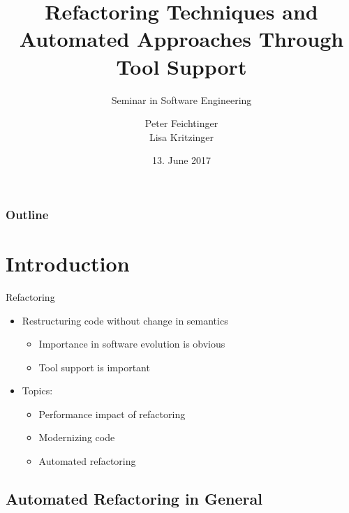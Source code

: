 \documentclass{beamer}
\title[Refactoring]{Refactoring Techniques and Automated Approaches Through Tool Support}
\subtitle{Seminar in Software Engineering}
\institute[]{Institute for Software Systems Engineering\\Johannes Kepler University Linz}
\author[Feichtinger, Kritzinger]{Peter Feichtinger\texorpdfstring{\\}{, }Lisa Kritzinger} %
\date{13. June 2017}
\begin{document}
\begin{frame}
  \titlepage
\end{frame}

\begin{frame}
  \frametitle{Outline}
  \tableofcontents[] 
\end{frame}


\section{Introduction}  %

\begin{frame}{Refactoring}
  \begin{itemize}
    \item Restructuring code without change in semantics
    \begin{itemize}
      \item Importance in software evolution is obvious
      \item Tool support is important
    \end{itemize}
  \end{itemize}
  \pause
  \begin{itemize}
    \item Topics:
    \begin{itemize}
      \item Performance impact of refactoring
      \item Modernizing code
      \item Automated refactoring
    \end{itemize}
  \end{itemize}
\end{frame}

\subsection{Automated Refactoring in General}
\end{document}
